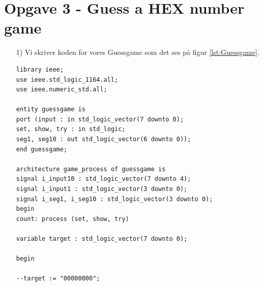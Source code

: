 \section{Opgave 3 - Guess a HEX number game}
\begin{enumerate}
	\item[1)]
	Vi skriver koden for vores Guessgame som det ses på figur \ref{lst:Guessgame}.\\
	\begin{lstlisting}[caption={Behavioral style kode for Guessgame},label={lst:Guessgame}]
library ieee;
use ieee.std_logic_1164.all;
use ieee.numeric_std.all;

entity guessgame is 
port (input : in std_logic_vector(7 downto 0);
set, show, try : in std_logic;
seg1, seg10 : out std_logic_vector(6 downto 0));
end guessgame;

architecture game_process of guessgame is
signal i_input10 : std_logic_vector(7 downto 4);
signal i_input1 : std_logic_vector(3 downto 0);
signal i_seg1, i_seg10 : std_logic_vector(3 downto 0);
begin
count: process (set, show, try)

variable target : std_logic_vector(7 downto 0);

begin

--target := "00000000";


\end{lstlisting}
\end{enumerate}
